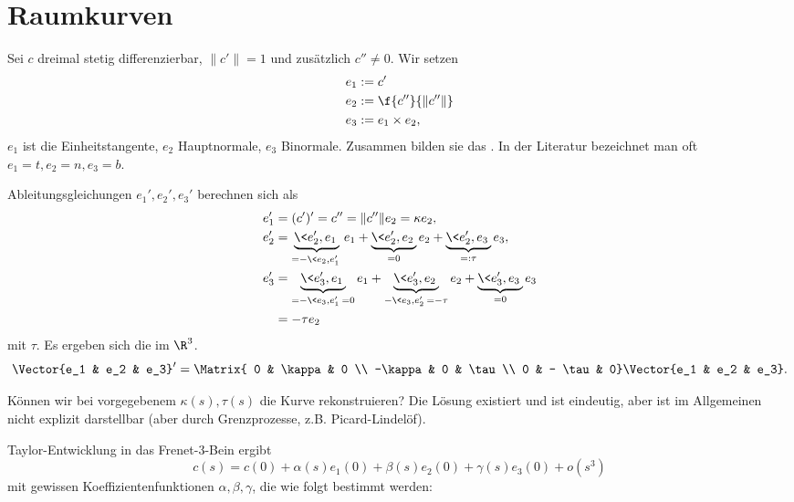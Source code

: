 \section{Raumkurven}

Sei $c$ dreimal stetig differenzierbar, $\|c'\| = 1$ und zusätzlich $c'' \neq 0$.
Wir setzen
\begin{align*}
	e_1 &:= c' \\
	e_2 &:= \f {c''}{\|c''\|} \\
	e_3 &:= e_1 \times e_2,
\end{align*}
$e_1$ ist die Einheitstangente, $e_2$ Hauptnormale, $e_3$ Binormale.
Zusammen bilden sie das .
In der Literatur bezeichnet man oft $e_1 = t, e_2 = n, e_3 = b$.

Ableitungsgleichungen $e_1', e_2', e_3'$ berechnen sich als
\begin{align*}
	e_1' &= (c')' = c'' = \|c''\| e_2 = \kappa e_2, \\
	e_2' &= \underbrace{\<e_2', e_1\>}_{=-\<e_2, e_1'\>} e_1 + \underbrace{\<e_2', e_2\>}_{=0} e_2 + \underbrace{\<e_2', e_3\>}_{=: \tau} e_3, \\
	e_3' &= \underbrace{\<e_3', e_1\>}_{=-\<e_3, e_1'\> = 0} e_1 + \underbrace{\<e_3', e_2\>}_{-\<e_3, e_2'\> = -\tau} e_2 + \underbrace{\< e_3', e_3 \>}_{=0} e_3 \\
	&= - \tau e_2
\end{align*}
mit  $\tau$.
Es ergeben sich die  im $\R^3$.
\[
	\Vector{e_1 & e_2 & e_3}'
	= \Matrix{ 0 & \kappa & 0 \\ -\kappa & 0 & \tau \\ 0 & - \tau & 0}
	\Vector{e_1 & e_2 & e_3}.
\]

Können wir bei vorgegebenem $\kappa(s), \tau(s)$ die Kurve rekonstruieren?
Die Lösung existiert und ist eindeutig, aber ist im Allgemeinen nicht explizit darstellbar (aber durch Grenzprozesse, z.B. Picard-Lindelöf).

Taylor-Entwicklung in das Frenet-3-Bein ergibt
\[
	c(s) = c(0) + \alpha(s)e_1(0) + \beta(s) e_2(0) + \gamma(s) e_3(0) + o(s^3)
\]
mit gewissen Koeffizientenfunktionen $\alpha, \beta, \gamma$, die wie folgt bestimmt werden:

